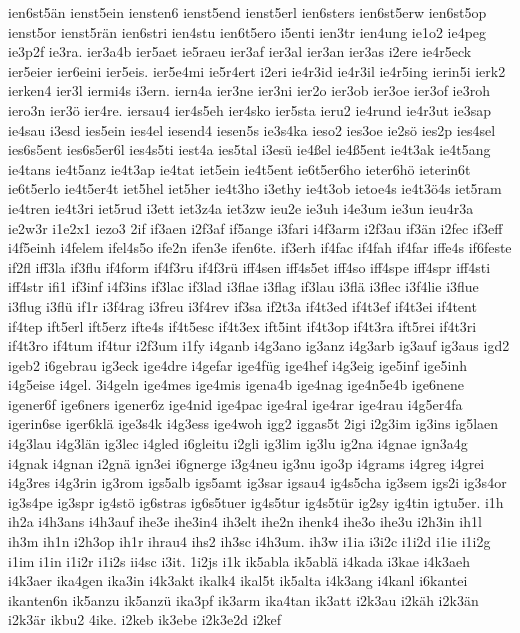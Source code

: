 {ien6st5än
ienst5ein
iensten6
ienst5end
ienst5erl
ien6sters
ien6st5erw
ien6st5op
ienst5or
ienst5rän
ien6stri
ien4stu
ien6t5ero
i5enti
ien3tr
ien4ung
ie1o2
ie4peg
ie3p2f
ie3ra.
ier3a4b
ier5aet
ie5raeu
ier3af
ier3al
ier3an
ier3as
i2ere
ie4r5eck
ier5eier
ier6eini
ier5eis.
ier5e4mi
ie5r4ert
i2eri
ie4r3id
ie4r3il
ie4r5ing
ierin5i
ierk2
ierken4
ier3l
iermi4s
i3ern.
iern4a
ier3ne
ier3ni
ier2o
ier3ob
ier3oe
ier3of
ie3roh
iero3n
ier3ö
ier4re.
iersau4
ier4s5eh
ier4sko
ier5sta
ieru2
ie4rund
ie4r3ut
ie3sap
ie4sau
i3esd
ies5ein
ies4el
iesend4
iesen5s
ie3s4ka
ieso2
ies3oe
ie2sö
ies2p
ies4sel
ies6s5ent
ies6s5er6l
ies4s5ti
iest4a
ies5tal
i3esü
ie4ßel
ie4ß5ent
ie4t3ak
ie4t5ang
ie4tans
ie4t5anz
ie4t3ap
ie4tat
iet5ein
ie4t5ent
ie6t5er6ho
ieter6hö
ieterin6t
ie6t5erlo
ie4t5er4t
iet5hel
iet5her
ie4t3ho
i3ethy
ie4t3ob
ietoe4s
ie4t3ö4s
iet5ram
ie4tren
ie4t3ri
iet5rud
i3ett
iet3z4a
iet3zw
ieu2e
ie3uh
i4e3um
ie3un
ieu4r3a
ie2w3r
i1e2x1
iezo3
2if
if3aen
i2f3af
if5ange
i3fari
i4f3arm
i2f3au
if3än
i2fec
if3eff
i4f5einh
i4felem
ifel4s5o
ife2n
ifen3e
ifen6te.
if3erh
if4fac
if4fah
if4far
iffe4s
if6feste
if2fl
iff3la
if3flu
if4form
if4f3ru
if4f3rü
iff4sen
iff4s5et
iff4so
iff4spe
iff4spr
iff4sti
iff4str
ifi1
if3inf
i4f3ins
if3lac
if3lad
i3flae
i3flag
if3lau
i3flä
i3flec
i3f4lie
i3flue
i3flug
i3flü
if1r
i3f4rag
i3freu
i3f4rev
if3sa
if2t3a
if4t3ed
if4t3ef
if4t3ei
if4tent
if4tep
ift5erl
ift5erz
ifte4s
if4t5esc
if4t3ex
ift5int
if4t3op
if4t3ra
ift5rei
if4t3ri
if4t3ro
if4tum
if4tur
i2f3um
i1fy
i4ganb
i4g3ano
ig3anz
i4g3arb
ig3auf
ig3aus
igd2
igeb2
i6gebrau
ig3eck
ige4dre
i4gefar
ige4füg
ige4hef
i4g3eig
ige5inf
ige5inh
i4g5eise
i4gel.
3i4geln
ige4mes
ige4mis
igena4b
ige4nag
ige4n5e4b
ige6nene
igener6f
ige6ners
igener6z
ige4nid
ige4pac
ige4ral
ige4rar
ige4rau
i4g5er4fa
igerin6se
iger6klä
ige3s4k
i4g3ess
ige4woh
igg2
iggas5t
2igi
i2g3im
ig3ins
ig5laen
i4g3lau
i4g3län
ig3lec
i4gled
i6gleitu
i2gli
ig3lim
ig3lu
ig2na
i4gnae
ign3a4g
i4gnak
i4gnan
i2gnä
ign3ei
i6gnerge
i3g4neu
ig3nu
igo3p
i4grams
i4greg
i4grei
i4g3res
i4g3rin
ig3rom
igs5alb
igs5amt
ig3sar
igsau4
ig4s5cha
ig3sem
igs2i
ig3s4or
ig3s4pe
ig3spr
ig4stö
ig6stras
ig6s5tuer
ig4s5tur
ig4s5tür
ig2sy
ig4tin
igtu5er.
i1h
ih2a
i4h3ans
i4h3auf
ihe3e
ihe3in4
ih3elt
ihe2n
ihenk4
ihe3o
ihe3u
i2h3in
ih1l
ih3m
ih1n
i2h3op
ih1r
ihrau4
ihs2
ih3sc
i4h3um.
ih3w
i1ia
i3i2c
i1i2d
i1ie
i1i2g
i1im
i1in
i1i2r
i1i2s
ii4sc
i3it.
1i2js
i1k
ik5abla
ik5ablä
i4kada
i3kae
i4k3aeh
i4k3aer
ika4gen
ika3in
i4k3akt
ikalk4
ikal5t
ik5alta
i4k3ang
i4kanl
i6kantei
ikanten6n
ik5anzu
ik5anzü
ika3pf
ik3arm
ika4tan
ik3att
i2k3au
i2käh
i2k3än
i2k3är
ikbu2
4ike.
i2keb
ik3ebe
i2k3e2d
i2kef
}
